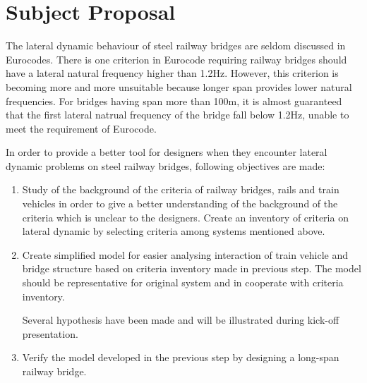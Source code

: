 
\chapter{Subject Proposal}

The lateral dynamic behaviour of steel railway bridges are seldom discussed in Eurocodes.  There is one criterion in Eurocode requiring railway bridges should have a lateral natural frequency higher than 1.2Hz. However, this criterion is becoming more and more unsuitable because longer span provides lower natural frequencies. For bridges having span more than 100m, it is almost guaranteed that the first lateral natrual frequency of the bridge fall below 1.2Hz, unable to meet the requirement of Eurocode.

In order to provide a better tool for designers when they encounter lateral dynamic problems on steel railway bridges, following objectives are made:

\begin{enumerate}

\item Study of the background of the criteria of railway bridges, rails and train vehicles in order to give a better understanding of the background of the criteria which is unclear to the designers.  Create an inventory of criteria on lateral dynamic by selecting criteria among systems mentioned above. 

\item Create simplified model for easier analysing interaction of train vehicle and bridge structure based on criteria inventory made in previous step. The model should be representative for original system and in cooperate with criteria inventory.

Several hypothesis have been made and will be illustrated during kick-off presentation.

\item Verify the model developed in the previous step by designing a long-span railway bridge. 

\end{enumerate}